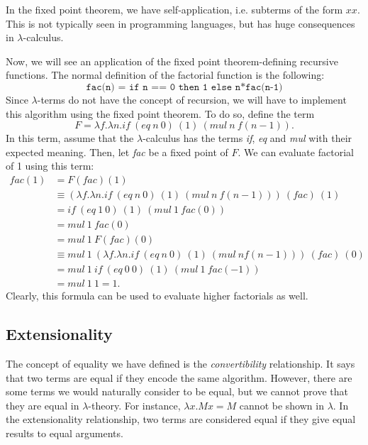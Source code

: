 \documentclass[a4paper, openany]{memoir}
\theoremstyle{definition}
\begin{document}
    In the fixed point theorem, we have self-application, i.e. subterms of the form $xx$. This is not typically seen in programming languages, but has huge consequences in $\lambda$-calculus.

    Now, we will see an application of the fixed point theorem-defining recursive functions. The normal definition of the factorial function is the following:
    \[\texttt{fac(n) = if n == 0 then 1 else n*fac(n-1)}\]
    Since $\lambda$-terms do not have the concept of recursion, we will have to implement this algorithm using the fixed point theorem. To do so, define the term
    \[F = \lambda f.\lambda n.\textit{if} \ (\textit{eq} \ n \ 0) \ (1) \ (\textit{mul} \ n \ f(n-1)).\]
    In this term, assume that the $\lambda$-calculus has the terms \textit{if}, \textit{eq} and \textit{mul} with their expected meaning. Then, let \textit{fac} be a fixed point of $F$. We can evaluate factorial of 1 using this term:
    \begin{align*}
        \textit{fac}(1) &= F(\textit{fac})(1) \\
        &\equiv (\lambda f.\lambda n.\textit{if} \ (\textit{eq} \ n \ 0) \ (1) \ (\textit{mul} \ n \ f(n-1))) \ (\textit{fac}) \ (1) \\
        &= \textit{if} \ (\textit{eq} \ 1 \ 0) \ (1) \ (\textit{mul} \ 1 \ \textit{fac}(0)) \\
        &= \textit{mul} \ 1 \ \textit{fac}(0) \\
        &= \textit{mul} \ 1 \ F(\textit{fac})(0) \\
        &\equiv \textit{mul} \ 1 \ (\lambda f.\lambda n.\textit{if} \ (\textit{eq} \ n \ 0) \ (1) \ (\textit{mul} \ n f(n-1))) \ (\textit{fac}) \ (0) \\
        &= \textit{mul} \ 1 \ \textit{if} \ (\textit{eq} \ 0 \ 0) \ (1) \ (\textit{mul} \ 1 \ \textit{fac}(-1))  \\
        &= \textit{mul} \ 1 \ 1 = 1.
    \end{align*}
    \noindent Clearly, this formula can be used to evaluate higher factorials as well.
    
    \subsection{Extensionality}
    The concept of equality we have defined is the \emph{convertibility} relationship. It says that two terms are equal if they encode the same algorithm. However, there are some terms we would naturally consider to be equal, but we cannot prove that they are equal in $\lambda$-theory. For instance, $\lambda x.Mx = M$ cannot be shown in $\lambda$. In the extensionality relationship, two terms are considered equal if they give equal results to equal arguments.
\end{document}
